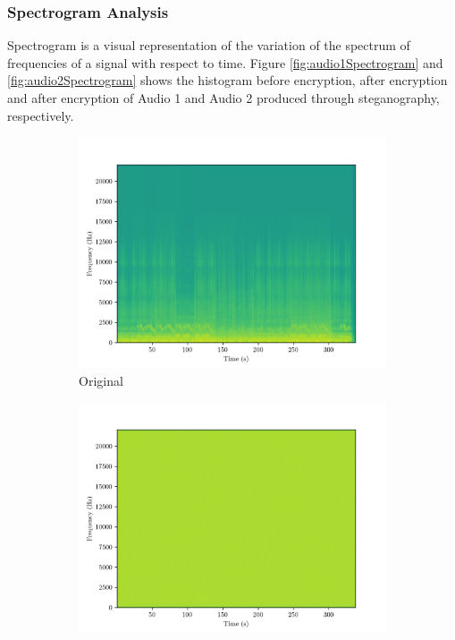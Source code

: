 \documentclass[a4paper]{cas-sc}
\begin{document}
\subsubsection{Spectrogram Analysis}
Spectrogram is a visual representation of the variation of the spectrum of frequencies of a signal with respect to time. Figure \ref{fig:audio1Spectrogram} and \ref{fig:audio2Spectrogram} shows the histogram before encryption, after encryption and after encryption of Audio 1 and Audio 2 produced through steganography, respectively.
\begin{figure}[pos=h]
    \begin{subfigure}[h]{0.3\textwidth}
        \begin{center}
            \includegraphics[width=\textwidth]{embedded1Spectrogram.png}
            \caption{Original}
            \label{fig:embedded1Spectrogram}
        \end{center}
    \end{subfigure}
    \begin{subfigure}[h]{0.3\textwidth}
        \begin{center}
            \includegraphics[width=\textwidth]{encrypted1Spectrogram.png}

\end{center}
\end{subfigure}
\end{figure}
\end{document}
